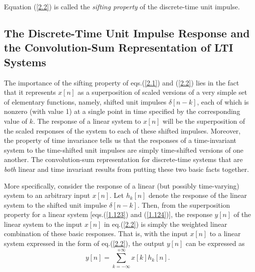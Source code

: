 \documentclass[a4paper,10pt,twoside]{book}
\begin{document}
Equation (\ref{2.2}) is called the \textit{sifting property} of the discrete-time unit impulse.

\subsection{The Discrete-Time Unit Impulse Response and the Convolution-Sum Representation of LTI Systems}

The importance of the sifting property of eqs.\;(\ref{2.1}) and (\ref{2.2}) lies in the fact that it represents $x[n]$ as a superposition of scaled versions of a very simple set of elementary functions, namely, shifted unit impulses $\delta[n-k]$, each of which is nonzero (with value 1) at a single point in time specified by the corresponding value of $k$. The response of a linear system to $x[n]$ will be the superposition of the scaled responses of the system to each of these shifted impulses. Moreover, the property of time invariance tells us that the responses of a time-invariant system to the time-shifted unit impulses are simply time-shifted versions of one another. The convolution-sum representation for discrete-time systems that are \textit{both} linear and time invariant results from putting these two basic facts together.

More specifically, consider the response of a linear (but possibly time-varying) system to an arbitrary input $x[n]$. Let $h_k[n]$ denote the response of the linear system to the shifted unit impulse $\delta[n-k]$. Then, from the superposition property for a linear system [eqs.\;(\ref{1.123}) and (\ref{1.124})], the response $y[n]$ of the linear system to the input $x[n]$ in eq.\;(\ref{2.2}) is simply the weighted linear combination of these basic responses. That is, with the input $x[n]$ to a linear system expressed in the form of eq.\;(\ref{2.2}), the output $y[n]$ can be expressed as
\begin{equation}
    y[n] = \sum_{k=-\infty}^{+\infty}x[k]h_{k}[n].
    \label{2.3}
\end{equation}
\end{document}

